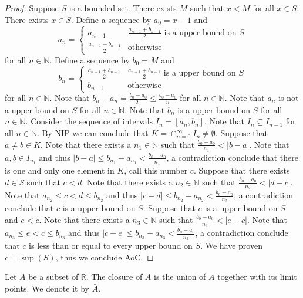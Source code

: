 \documentclass[12pt]{article}
\makeatletter
\theoremstyle{homework}
\newenvironment{exercise}[1]
{\def\@currentlabel{#1}\exercisecore}
{\endexercisecore}
\makeatother
\begin{document}
\begin{proof}
Suppose $S$ is a bounded set.  There exists $M$ such that $x<M$ for all $x\in S$.  There exists $x\in S$.  Define a sequence by $a_0=x-1$ and 
$$a_n=\begin{cases} a_{n-1} & \frac{a_{n-1}+b_{n-1}}{2} \text{ is a upper bound on }S\\
\frac{a_{n-1}+b_{n-1}}{2} & \text{otherwise}\end{cases}$$for all $n\in\mathbb{N}$.  
Define a sequence by $b_0=M$ and 
$$b_n=\begin{cases} \frac{a_{n-1}+b_{n-1}}{2} & \frac{a_{n-1}+b_{n-1}}{2} \text{ is a upper bound on }S\\
b_{n-1} & \text{otherwise}\end{cases}$$for all $n\in\mathbb{N}$.  
Note that $b_n-a_n=\frac{b_0-a_0}{2^n}\leq \frac{b_0-a_0}{n}$ for all $n\in\mathbb{N}$.  Note that $a_n$ is not a upper bound on $S$ for all $n\in\mathbb{N}$.  Note that $b_n$ is a upper bound on $S$ for all $n\in\mathbb{N}$.  Consider the sequence of intervals $I_n=[a_n,b_n]$.  Note that $I_n\subseteq I_{n-1}$ for all $n\in\mathbb{N}$.  By NIP we can conclude that $K=\cap_{n=0}^\infty I_n\neq \emptyset$.  Suppose that $a\neq b\in K$.  Note that there exists a $n_1\in\mathbb{N}$ such that $\frac{b_0-a_0}{n_1}<|b-a|$.  Note that $a,b\in I_{n_1}$ and thus $|b-a|\leq b_{n_1}-a_{n_1}<\frac{b_0-a_0}{{n_1}}$, a contradiction conclude that there is one and only one element in $K$, call this number $c$.  Suppose that there exists $d\in S$ such that $c<d$.  Note that there exists a $n_2\in\mathbb{N}$ such that $\frac{b_0-a_0}{n_2}<|d-c|$.  Note that $a_{n_2}\leq c<d\leq b_{n_2}$ and thus $|c-d|\leq b_{n_2}-a_{n_2}<\frac{b_0-a_0}{{n_2}}$, a contradiction conclude that $c$ is a upper bound on $S$.  Suppose that $e$ is a upper bound on $S$ and $e<c$.  Note that there exists a $n_3\in\mathbb{N}$ such that $\frac{b_0-a_0}{n_3}<|e-c|$.  Note that $a_{n_3}\leq e<c\leq b_{n_3}$ and thus $|c-e|\leq b_{n_3}-a_{n_3}<\frac{b_0-a_0}{{n_3}}$, a contradiction conclude that $c$ is less than or equal to every upper bound on $S$.  We have proven $c=\sup(S)$, thus we conclude AoC.
\end{proof}
\begin{exercise}
6
Let $A$ be a subset of $\mathbb{R}$. The closure of $A$ is the union of $A$ together with its limit points.
We denote it by $\bar{A}$.
\end{exercise}
\end{document}
